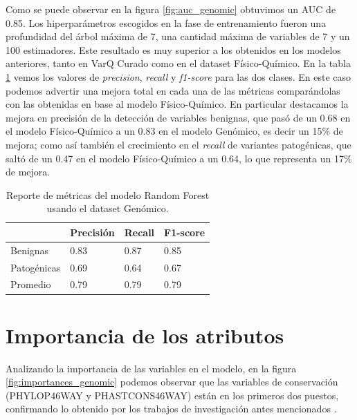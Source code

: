Como se puede observar en la figura \ref{fig:auc_genomic} obtuvimos un AUC de 0.85. Los hiperparámetros escogidos en la fase de entrenamiento fueron una profundidad del árbol máxima de 7, una cantidad máxima de variables de 7 y un 100 estimadores.
Este resultado es muy superior a los obtenidos en los modelos anteriores, tanto en VarQ Curado como en el dataset Físico-Químico. En la tabla \ref{tab:metrics_genomic} vemos los valores de \textit{precision}, \textit{recall} y \textit{f1-score} para las dos clases. En este caso podemos advertir una mejora total en cada una de las métricas comparándolas con las obtenidas en base al modelo Físico-Químico. En particular destacamos la mejora en precisión de la detección de variables benignas, que pasó de un 0.68 en el modelo Físico-Químico a un 0.83 en el modelo Genómico, es decir un 15\% de mejora; como así también el crecimiento en el \textit{recall} de variantes patogénicas, que saltó de un 0.47 en el modelo Físico-Químico a un 0.64, lo que representa un 17\% de mejora.

\begin{table}[H]
\centering
\begin{tabular}{|l|l|l|l|}
\hline
             & Precisión & Recall & F1-score \\ \hline
Benignas     & 0.83      & 0.87   & 0.85     \\ \hline
Patogénicas  & 0.69      & 0.64   & 0.67     \\ \hline
Promedio     & 0.79      & 0.79   & 0.79     \\ \hline
\end{tabular}
\caption{Reporte de métricas del modelo Random Forest usando el dataset Genómico.}
\label{tab:metrics_genomic}
\end{table}



\section{Importancia de los atributos}
Analizando la importancia de las variables en el modelo, en la figura \ref{fig:importances_genomic} podemos observar que las variables de conservación (PHYLOP46WAY y PHASTCONS46WAY) están en los primeros dos puestos, confirmando lo obtenido por los trabajos de investigación antes mencionados \cite{Shihab2015} \cite{Carter2013}. 

